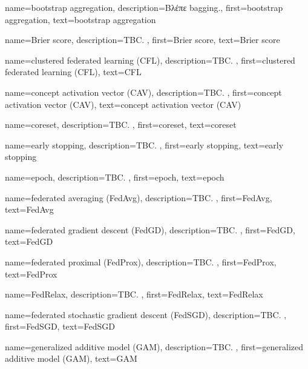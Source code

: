 {name={bootstrap aggregation}, 
	description={\foreignlanguage{greek}{Βλέπε} \gls{bagging}.},
 	first={bootstrap aggregation},
 	text={bootstrap aggregation} 
}%

{name={Brier score},
	description={TBC. },
	first={Brier score},
	text={Brier score}
}

{name={clustered federated learning (CFL)}, 
	description={TBC. }, 
	first={clustered federated learning (CFL)},
	text={CFL} 
}

{name={concept activation vector (CAV)},
	description={TBC. }, 
	first={concept activation vector (CAV)},
	text={concept activation vector (CAV)}
}

{name={coreset}, 
	description={TBC. },
	first={coreset},
	text={coreset} 
}

{name={early stopping}, 
	description={TBC. },
	first={early stopping},
	text={early stopping}
}

{name={epoch},
	description={TBC. },
	first={epoch},
	text={epoch}
}

{name={federated averaging (FedAvg)},
	description={TBC. },
	first={FedAvg},
	text={Fed\-Avg}
} 

{name={federated gradient descent (FedGD)},
	description={TBC. },
	first={FedGD},
	text={FedGD}
} 

{name={federated proximal (FedProx)},
	description={TBC. }, 
	first={FedProx}, 
	text={FedProx} 
}

{name={FedRelax},
	description={TBC. },
	first={FedRelax},
	text={FedRelax}
} 

{name={federated stochastic gradient descent (FedSGD)},
	description={TBC. },
	first={FedSGD},
	text={FedSGD}
}

{name={generalized additive model (GAM)},
	description={TBC. },
 	first={generalized additive model (GAM)},
 	text={GAM}
}


